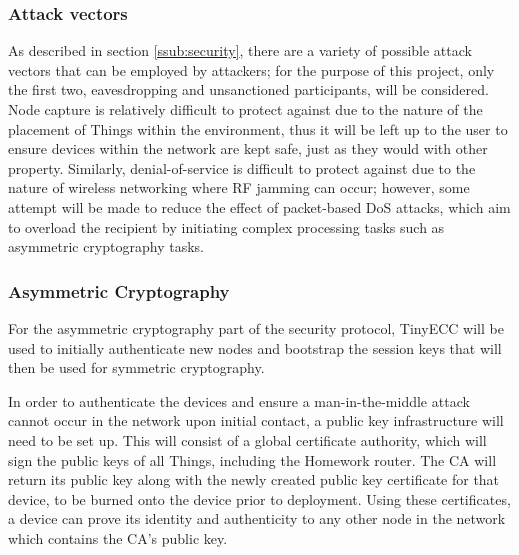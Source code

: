 \documentclass{mprop}
\begin{document}
\subsubsection{Attack vectors} %
\label{ssub:attack_vectors}
As described in section \ref{ssub:security}, there are a variety of possible attack vectors that can be employed by attackers; for the purpose of this project, only the first two, eavesdropping and unsanctioned participants, will be considered. Node capture is relatively difficult to protect against due to the nature of the placement of Things within the environment, thus it will be left up to the user to ensure devices within the network are kept safe, just as they would with other property. Similarly, denial-of-service is difficult to protect against due to the nature of wireless networking where RF jamming can occur; however, some attempt will be made to reduce the effect of packet-based DoS attacks, which aim to overload the recipient by initiating complex processing tasks such as asymmetric cryptography tasks. 


\subsubsection{Asymmetric Cryptography} %
\label{ssub:asymmetric_key_cryptography}
For the asymmetric cryptography part of the security protocol, TinyECC\cite{TinyECC} will be used to initially authenticate new nodes and bootstrap the session keys that will then be used for symmetric cryptography. 

In order to authenticate the devices and ensure a man-in-the-middle attack cannot occur in the network upon initial contact, a public key infrastructure will need to be set up. This will consist of a global certificate authority, which will sign the public keys of all Things, including the Homework router. The CA will return its public key along with the newly created public key certificate for that device, to be burned onto the device prior to deployment. Using these certificates, a device can prove its identity and authenticity to any other node in the network which contains the CA's public key. 
\end{document}
